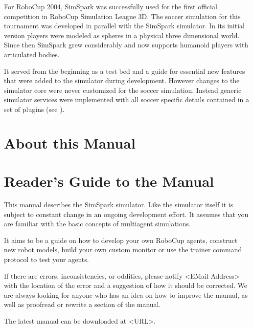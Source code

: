 For RoboCup 2004, SimSpark was successfully used for the first
official competition in RoboCup Simulation League 3D.  The soccer
simulation for this tournament was developed in parallel with the
SimSpark simulator. In its initial version players were modeled as
spheres in a physical three dimensional world. Since then SimSpark
grew considerably and now supports humanoid players with
articulated bodies.

It served from the beginning as a test bed and a guide for essential
new features that were added to the simulator during
development. However changes to the simulator core were never
customized for the soccer simulation. Instead generic
simulator services were implemented with all soccer specific
details contained in a set of plugins (see \cite{OR05}).

\section{About this Manual}

\section{Reader's Guide to the Manual}


This manual describes the SimSpark simulator. Like the simulator
itself it is subject to constant change in an ongoing development
effort. It assumes that you are familiar with the basic concepts of
multiagent simulations.

It aims to be a guide on how to develop your own RoboCup agents,
construct new robot models, build your own custom monitor or use the
trainer command protocol to test your agents.

If there are errors, inconsistencies, or oddities, please notify
<EMail Address> with the location of the error and a suggestion of how
it should be corrected. We are always looking for anyone who has an
idea on how to improve the manual, as well as proofread or rewrite a
section of the manual.

The latest manual can be downloaded at <URL>.

